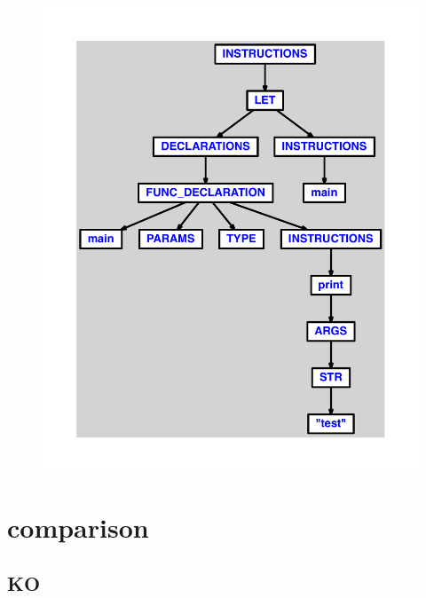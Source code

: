 \documentclass{article}
\begin{document}
\begin{figure}[H]\centering\includegraphics[max width=\textwidth]{ast/ast_163.pdf}\end{figure}\section{comparison}
\subsection{KO}
\end{document}
